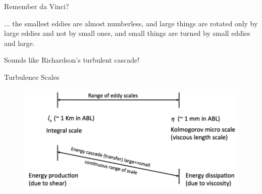 \begin{frame}{Remember da Vinci?}
  \setlength{\fboxsep}{0pt}
  \setlength{\fboxrule}{1pt}
  \begin{figure}[H]
  \centering
  \end{figure}
  
      \begin{fancyquotes}
      ... the smallest eddies are almost numberless, and large things are rotated only by large eddies and not by small ones, and small things are turned by small eddies and large.	
      \end{fancyquotes}
Sounds like Richardson's turbulent cascade!
\end{frame}

\begin{frame}{Turbulence Scales}
\begin{figure}
	\includegraphics[width=1\textwidth]{scales2.png}
\end{figure}
\end{frame}


